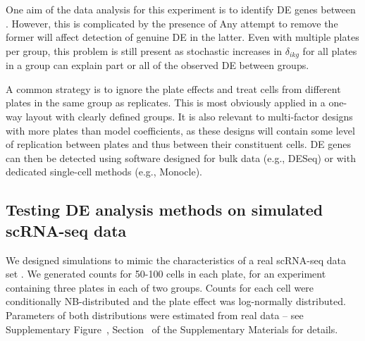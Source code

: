 \documentclass[oupdraft]{bio}
\begin{document}
One  aim of the data analysis for this experiment is to identify DE genes between .
However, this is complicated by the presence of 
Any attempt to remove the former will affect detection of genuine DE in the latter.
Even with multiple plates per group, this problem is still present as stochastic increases in $\delta_{ikg}$ for all plates in a group can explain part or all of the observed DE between groups.

A common strategy is to ignore the plate effects and treat cells from different plates in the same group as replicates.
This is most obviously applied in a one-way layout with clearly defined groups.
It is also relevant to multi-factor designs with more plates than model coefficients, as these designs will contain some level of replication between plates and thus between their constituent cells.
DE genes can then be detected using software designed for bulk data (e.g., DESeq) or with dedicated single-cell methods (e.g., Monocle).

\subsection{Testing DE analysis methods on simulated scRNA-seq data}
We designed simulations to mimic the characteristics of a real scRNA-seq data set \citep{kolod2015single}.
We generated counts for 50-100 cells in each plate, for an experiment containing three plates in each of two groups.
Counts for each cell were conditionally NB-distributed and the plate effect was log-normally distributed.
Parameters of both distributions were estimated from real data -- see Supplementary Figure~\suppparamsim{}, Section~\suppsimulation{} of the Supplementary Materials for details.
\end{document}
